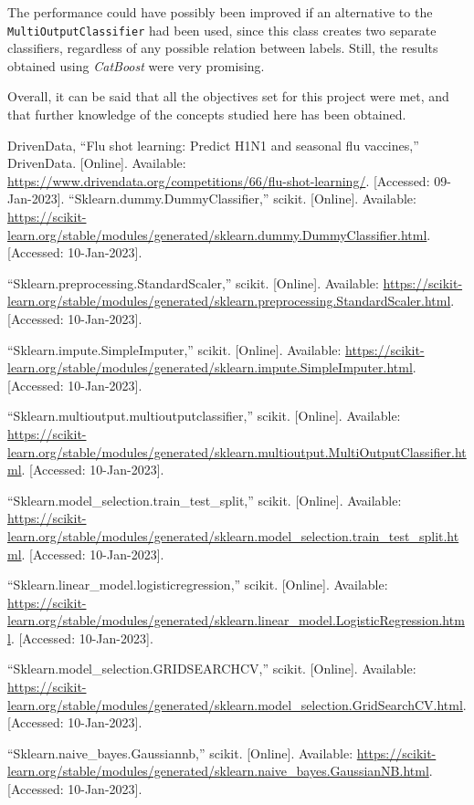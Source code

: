 \documentclass{IEEEtran}
\begin{document}
The performance could have possibly been improved if an alternative to the \texttt{MultiOutputClassifier} had been used, since this class creates two separate classifiers, regardless of any possible relation between labels. Still, the results obtained using \textit{CatBoost} were very promising.

Overall, it can be said that all the objectives set for this project were met, and that further knowledge of the concepts studied here has been obtained.

\begin{thebibliography}{00}
     DrivenData, “Flu shot learning: Predict H1N1 and seasonal flu vaccines,” DrivenData. [Online]. Available: \url{https://www.drivendata.org/competitions/66/flu-shot-learning/}. [Accessed: 09-Jan-2023].
     “Sklearn.dummy.DummyClassifier,” scikit. [Online]. Available: \url{https://scikit-learn.org/stable/modules/generated/sklearn.dummy.DummyClassifier.html}. [Accessed: 10-Jan-2023].

     “Sklearn.preprocessing.StandardScaler,” scikit. [Online]. Available: \url{https://scikit-learn.org/stable/modules/generated/sklearn.preprocessing.StandardScaler.html}. [Accessed: 10-Jan-2023]. 

     “Sklearn.impute.SimpleImputer,” scikit. [Online]. Available: \url{https://scikit-learn.org/stable/modules/generated/sklearn.impute.SimpleImputer.html}. [Accessed: 10-Jan-2023].

     “Sklearn.multioutput.multioutputclassifier,” scikit. [Online]. Available: \url{https://scikit-learn.org/stable/modules/generated/sklearn.multioutput.MultiOutputClassifier.html}. [Accessed: 10-Jan-2023]. 

     “Sklearn.model\_selection.train\_test\_split,” scikit. [Online]. Available: \url{https://scikit-learn.org/stable/modules/generated/sklearn.model_selection.train_test_split.html}. [Accessed: 10-Jan-2023].

     “Sklearn.linear\_model.logisticregression,” scikit. [Online]. Available: \url{https://scikit-learn.org/stable/modules/generated/sklearn.linear_model.LogisticRegression.html}. [Accessed: 10-Jan-2023]. 

     “Sklearn.model\_selection.GRIDSEARCHCV,” scikit. [Online]. Available: \url{https://scikit-learn.org/stable/modules/generated/sklearn.model_selection.GridSearchCV.html}. [Accessed: 10-Jan-2023]. 

     “Sklearn.naive\_bayes.Gaussiannb,” scikit. [Online]. Available: \url{https://scikit-learn.org/stable/modules/generated/sklearn.naive_bayes.GaussianNB.html}. [Accessed: 10-Jan-2023]. 


\end{thebibliography}
\end{document}
